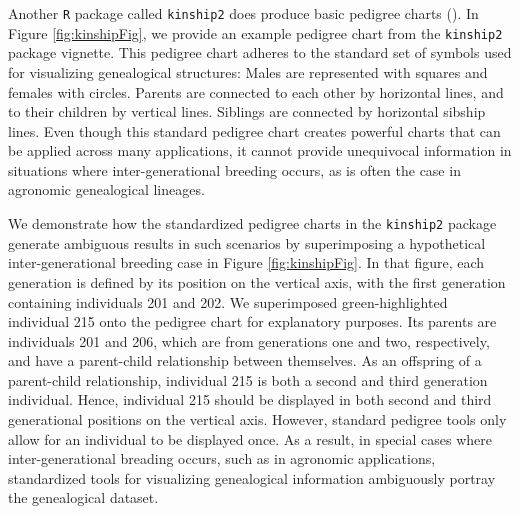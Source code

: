 \documentclass[11pt,a4paper,oldfontcommands,openany]{memoir}
\numberwithin{equation}{section} %
\newcommand{\pkg}[1]{{\texttt{#1}}}
\begin{document}
Another \pkg{R} package called \pkg{kinship2} does produce basic pedigree charts (\citealt{kin}). In Figure \ref{fig:kinshipFig}, we provide an example pedigree chart from the \pkg{kinship2} package vignette. This pedigree chart adheres to the standard set of symbols used for visualizing genealogical structures: Males are represented with squares and females with circles. Parents are connected to each other by horizontal lines, and to their children by vertical lines. Siblings are connected by horizontal sibship lines. Even though this standard pedigree chart creates powerful charts that can be applied across many applications, it cannot provide unequivocal information in situations where inter-generational breeding occurs, as is often the case in agronomic genealogical lineages.

We demonstrate how the standardized pedigree charts in the \pkg{kinship2} package generate ambiguous results in such scenarios by superimposing a hypothetical inter-generational breeding case in Figure \ref{fig:kinshipFig}. In that figure, each generation is defined by its position on the vertical axis, with the first generation containing individuals 201 and 202. We superimposed green-highlighted individual 215 onto the pedigree chart for explanatory purposes. Its parents are individuals 201 and 206, which are from generations one and two, respectively, and have a parent-child relationship between themselves. As an offspring of a parent-child relationship, individual 215 is both a second and third generation individual. Hence, individual 215 should be displayed in both second and third generational positions on the vertical axis. However, standard pedigree tools only allow for an individual to be displayed once. As a result, in special cases where inter-generational breading occurs, such as in agronomic applications, standardized tools for visualizing genealogical information ambiguously portray the genealogical dataset.
\end{document}
